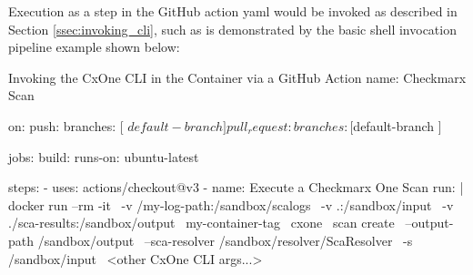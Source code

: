 Execution as a step in the GitHub action yaml would be invoked as described in 
Section \ref{ssec:invoking_cli}, such as is demonstrated by the basic shell invocation pipeline
example shown below:\\

\begin{code}{Invoking the CxOne CLI in the Container via a GitHub Action}{}{}
name: Checkmarx Scan

on:
    push:
        branches: [ $default-branch ]
    pull_request:
        branches: [ $default-branch ]

jobs:
    build:
        runs-on: ubuntu-latest

    steps:
        - uses: actions/checkout@v3
        - name: Execute a Checkmarx One Scan
            run: |
                docker run --rm -it \
                -v /my-log-path:/sandbox/scalogs \
                -v .:/sandbox/input \
                -v ./sca-results:/sandbox/output \
                my-container-tag \
                cxone \
                scan create \
                --output-path /sandbox/output \
                --sca-resolver /sandbox/resolver/ScaResolver \
                -s /sandbox/input \
                <other CxOne CLI args...>            
    
\end{code}
